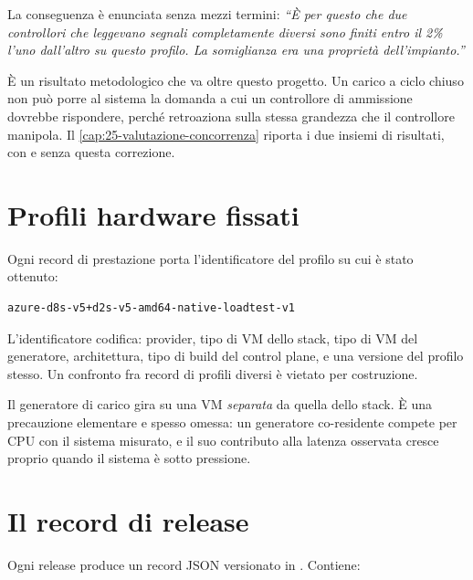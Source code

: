 La conseguenza \`e enunciata senza mezzi termini: \emph{``\`E per questo che due
controllori che leggevano segnali completamente diversi sono finiti entro il 2\%
l'uno dall'altro su questo profilo. La somiglianza era una propriet\`a
dell'impianto.''}

\`E un risultato metodologico che va oltre questo progetto. Un carico a ciclo
chiuso non pu\`o porre al sistema la domanda a cui un controllore di ammissione
dovrebbe rispondere, perch\'e retroaziona sulla stessa grandezza che il
controllore manipola. Il \cref{cap:25-valutazione-concorrenza} riporta i due
insiemi di risultati, con e senza questa correzione.

\section{Profili hardware fissati}

Ogni record di prestazione porta l'identificatore del profilo su cui \`e stato
ottenuto:

\begin{lstlisting}[language=bash]
azure-d8s-v5+d2s-v5-amd64-native-loadtest-v1
\end{lstlisting}

L'identificatore codifica: provider, tipo di VM dello stack, tipo di VM del
generatore, architettura, tipo di build del control plane, e una versione del
profilo stesso. Un confronto fra record di profili diversi \`e vietato per
costruzione.

Il generatore di carico gira su una VM \emph{separata} da quella dello stack. \`E
una precauzione elementare e spesso omessa: un generatore co-residente compete
per CPU con il sistema misurato, e il suo contributo alla latenza osservata
cresce proprio quando il sistema \`e sotto pressione.

\section{Il record di release}

Ogni release produce un record JSON versionato in
. Contiene:

